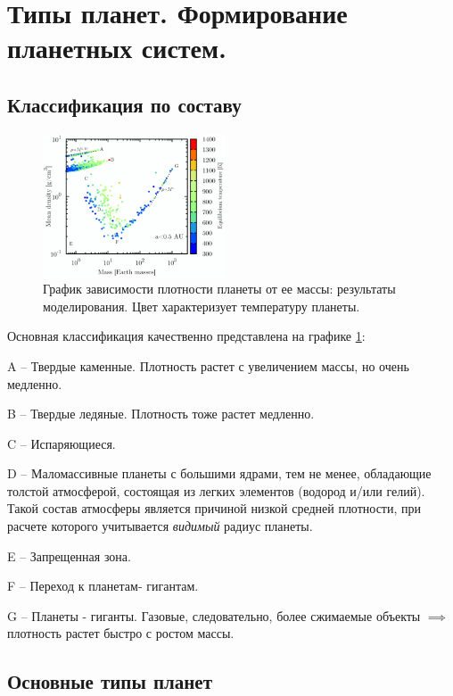 \section{Типы планет. Формирование планетных систем.}
\subsection{Классификация по составу}
\begin{figure}
  \begin{center}
    \includegraphics[width=0.48\textwidth]{Pictures/4_types.png}
  \end{center}
  \caption{График зависимости плотности планеты от ее массы: результаты моделирования. Цвет характеризует температуру планеты.}
  \label{fig:4_types}
\end{figure}
Основная классификация качественно представлена на графике \ref{fig:4_types}: 

A -- Твердые каменные. Плотность растет с увеличением массы, но очень медленно.

B -- Твердые ледяные. Плотность тоже растет медленно.

C -- Испаряющиеся.

D -- Маломассивные планеты с большими ядрами, тем не менее, обладающие толстой атмосферой, состоящая из легких элементов (водород и/или гелий). Такой состав атмосферы является причиной низкой средней плотности, при расчете которого учитывается \textit{видимый} радиус планеты.

E -- Запрещенная зона.

F -- Переход к планетам- гигантам.

G -- Планеты - гиганты. Газовые, следовательно, более сжимаемые объекты $\implies$ плотность растет быстро с ростом массы. 

\subsection{Основные типы планет}


